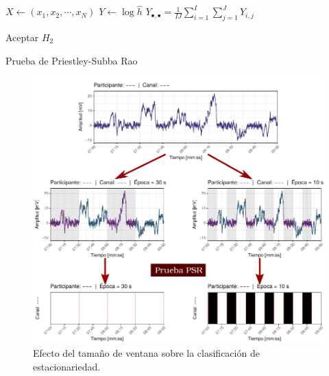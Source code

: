 
\begin{algorithm}
\DontPrintSemicolon
{}

$ X \leftarrow \left(x_1, x_2, \cdots, x_N \right)$\;
$Y \leftarrow \log{\widehat{h}}$\;
$Y_{\bullet,\bullet} = \frac{1}{I J} \sum_{i=1}^{I} \sum_{j=1}^{J} Y_{i,j}$ \;

Aceptar $H_2$ \;

\caption{Prueba de Priestley-Subba Rao}
\label{algoritmo_stationarity}
\end{algorithm}

\begin{figure}
\centering
\includegraphics[width=\linewidth]{./img_diagramas/epocas_diferentes_v3.pdf}
\caption{Efecto del tamaño de ventana sobre la clasificación de estacionariedad.}
\label{epocas_diferentes}
\end{figure}

